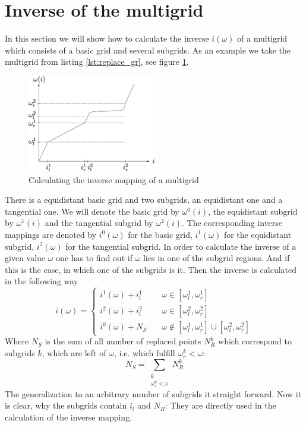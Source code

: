 \section{Inverse of the multigrid}\label{sec:inverse_of_the_multigrid}
In this section we will show how to calculate the inverse $i(\omega)$ of a multigrid which consists of a basic grid and several subgrids. As an example we take the multigrid from listing \ref{lst:replace_gr}, see figure \ref{fig:inverse}.

\begin{figure}[h]
	\centering
	\includegraphics[width=0.5\textwidth]{pics/inverse.eps}
	\caption{Calculating the inverse mapping of a multigrid}
	\label{fig:inverse}
\end{figure}

There is a equidistant basic grid and two subgrids, an equidistant one and a tangential one. We will denote the basic grid by $\omega^0(i)$, the equidistant subgrid by $\omega^1(i)$ and the tangential subgrid by $\omega^2(i)$. The corresponding inverse mappings are denoted by $i^0(\omega)$ for the basic grid, $i^1(\omega)$ for the equidistant subgrid, $i^2(\omega)$ for the tangential subgrid. In order to calculate the inverse of a given value $\omega$ one has to find out if $\omega$ lies in one of the subgrid regions. And if this is the case, in which one of the subgrids is it. Then the inverse is calculated in the following way
\begin{equation}\label{eqn:inverse}
	i(\omega)=\begin{cases}
			i^1(\omega) + i_l^1 \quad & \omega \in [\omega_l^1, \omega_r^1]\\
			i^2(\omega) + i_l^2 \quad & \omega \in [\omega_l^2, \omega_r^2]\\
			i^0(\omega) + N_S \quad & \omega \notin [\omega_l^1, \omega_r^1] \cup [\omega_l^2, \omega_r^2]
	          \end{cases}
\end{equation}
Where $N_S$ is the sum of all number of replaced points $N_R^k$ which correspond to subgrids $k$, which are left of $\omega$, i.e. which fulfill $\omega_r^k<\omega$:
\[
	N_S=\sum_{\substack{k\\ \omega_r^k<\omega}} N_R^k
\]
The generalization to an arbitrary number of subgrids it straight forward. Now it is clear, why the subgrids contain $i_l$ and $N_R$: They are directly used in the calculation of the inverse mapping.

